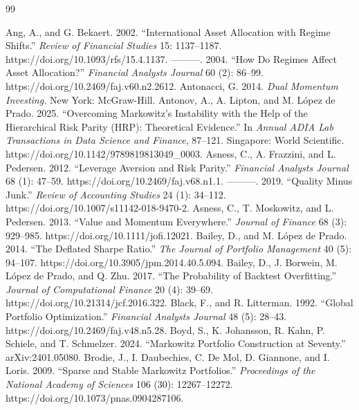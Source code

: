 \documentclass[12pt,letterpaper]{article}
\begin{document}
\begin{thebibliography}{99}
\setlength{\itemsep}{2pt}
\setlength{\parskip}{0pt}

 Ang, A., and G. Bekaert. 2002. ``International Asset Allocation with Regime Shifts.'' \emph{Review of Financial Studies} 15: 1137–1187. https://doi.org/10.1093/rfs/15.4.1137.
 ---------. 2004. ``How Do Regimes Affect Asset Allocation?'' \emph{Financial Analysts Journal} 60 (2): 86–99. https://doi.org/10.2469/faj.v60.n2.2612.
 Antonacci, G. 2014. \emph{Dual Momentum Investing.} New York: McGraw-Hill.
 Antonov, A., A. Lipton, and M. L\'opez de Prado. 2025. ``Overcoming Markowitz's Instability with the Help of the Hierarchical Risk Parity (HRP): Theoretical Evidence.'' In \emph{Annual ADIA Lab Transactions in Data Science and Finance}, 87–121. Singapore: World Scientific. https://doi.org/10.1142/9789819813049\_0003.
 Asness, C., A. Frazzini, and L. Pedersen. 2012. ``Leverage Aversion and Risk Parity.'' \emph{Financial Analysts Journal} 68 (1): 47–59. https://doi.org/10.2469/faj.v68.n1.1.
 ---------. 2019. ``Quality Minus Junk.'' \emph{Review of Accounting Studies} 24 (1): 34–112. https://doi.org/10.1007/s11142-018-9470-2.
 Asness, C., T. Moskowitz, and L. Pedersen. 2013. ``Value and Momentum Everywhere.'' \emph{Journal of Finance} 68 (3): 929–985. https://doi.org/10.1111/jofi.12021.
 Bailey, D., and M. L\'opez de Prado. 2014. ``The Deflated Sharpe Ratio.'' \emph{The Journal of Portfolio Management} 40 (5): 94–107. https://doi.org/10.3905/jpm.2014.40.5.094.
 Bailey, D., J. Borwein, M. L\'opez de Prado, and Q. Zhu. 2017. ``The Probability of Backtest Overfitting.'' \emph{Journal of Computational Finance} 20 (4): 39–69. https://doi.org/10.21314/jcf.2016.322.
 Black, F., and R. Litterman. 1992. ``Global Portfolio Optimization.'' \emph{Financial Analysts Journal} 48 (5): 28–43. https://doi.org/10.2469/faj.v48.n5.28.
 Boyd, S., K. Johansson, R. Kahn, P. Schiele, and T. Schmelzer. 2024. ``Markowitz Portfolio Construction at Seventy.'' arXiv:2401.05080.
 Brodie, J., I. Daubechies, C. De Mol, D. Giannone, and I. Loris. 2009. ``Sparse and Stable Markowitz Portfolios.'' \emph{Proceedings of the National Academy of Sciences} 106 (30): 12267–12272. https://doi.org/10.1073/pnas.0904287106.

\end{thebibliography}
\end{document}
